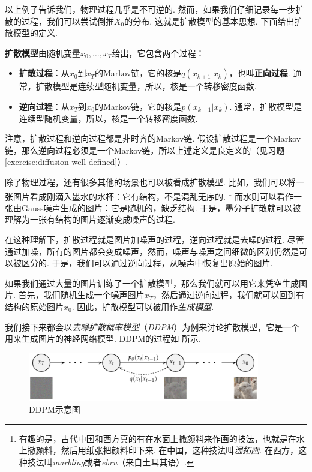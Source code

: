 以上例子告诉我们，物理过程几乎是不可逆的. 然而，如果我们仔细记录每一步扩散的过程，我们可以尝试倒推$X_0$的分布. 这就是扩散模型的基本思想. 下面给出扩散模型的定义.

\begin{definition}[扩散模型]
\textbf{扩散模型}由随机变量$x_0,\dots,x_T$给出，它包含两个过程：
\begin{itemize}
    \item \textbf{扩散过程}：从$x_0$到$x_T$的Markov链，它的核是$q(x_{k+1}|x_k)$，也叫\textbf{正向过程}. 通常，扩散模型是连续型随机变量，所以，核是一个转移密度函数. 
    
    \item \textbf{逆向过程}：从$x_T$到$x_0$的Markov链，它的核是$p(x_{k-1}|x_k)$. 通常，扩散模型是连续型随机变量，所以，核是一个转移密度函数. 
\end{itemize}
\end{definition}

注意，扩散过程和逆向过程都是非时齐的Markov链. 假设扩散过程是一个Markov链，那么逆向过程必须是一个Markov链，所以上述定义是良定义的（见习题 \ref{exercise:diffusion-well-defined}）. 

除了物理过程，还有很多其他的场景也可以被看成扩散模型. 比如，我们可以将一张图片看成刚滴入墨水的水杯：它有结构，不是混乱无序的. \footnote{有趣的是，古代中国和西方真的有在水面上撒颜料来作画的技法，也就是在水上撒颜料，然后用纸张把颜料印下来. 在中国，这种技法叫\emph{湿拓画}. 在西方，这种技法叫\emph{marbling}或者\emph{ebru}（来自土耳其语）. } 而水则可以看作一张由Gauss噪声生成的图片：它是随机的，缺乏结构. 于是，墨分子扩散就可以被理解为一张有结构的图片逐渐变成噪声的过程. 

在这种理解下，扩散过程就是图片加噪声的过程，逆向过程就是去噪的过程. 尽管通过加噪，所有的图片都会变成噪声，然而，噪声与噪声之间细微的区别仍然是可以被区分的. 于是，我们可以通过逆向过程，从噪声中恢复出原始的图片. 

如果我们通过大量的图片训练了一个扩散模型，那么我们就可以用它来凭空生成图片. 首先，我们随机生成一个噪声图片$x_T$，然后通过逆向过程，我们就可以回到有结构的原始图片$x_0$. 因此，扩散模型可以被用作\emph{生成模型}. 

我们接下来都会以\emph{去噪扩散概率模型}（\emph{DDPM}）为例来讨论扩散模型，它是一个用来生成图片的神经网络模型. DDPM的过程如 所示. 

\begin{figure}[ht]
    \centering
    \includegraphics[width=0.9\textwidth]{figures/Markov-chain/DDPM.pdf}
    \caption{DDPM示意图}\label{fig:DDPM}
\end{figure}


